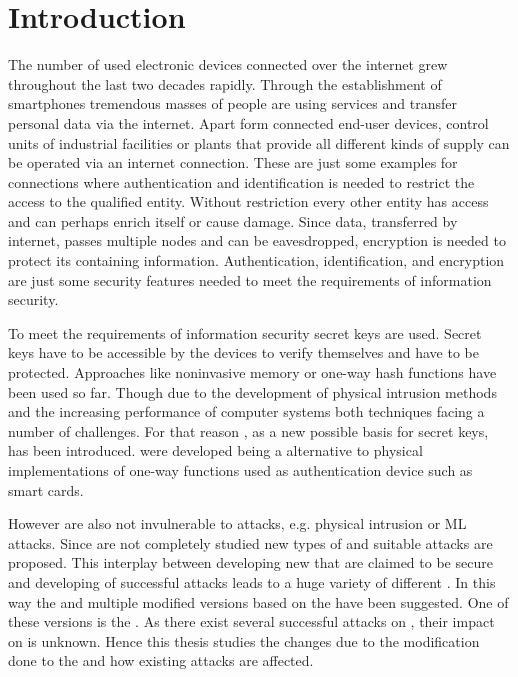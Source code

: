 \chapter{Introduction}

The number of used electronic devices connected over the internet grew throughout the last two decades rapidly.
Through the establishment of smartphones tremendous masses of people are using services and transfer personal data via the internet.
Apart form connected end-user devices, control units of industrial facilities or plants that provide all different kinds of supply can be operated via an internet connection.
These are just some examples for connections where authentication and identification is needed to restrict the access to the qualified entity.
Without restriction every other entity has access and can perhaps enrich itself or cause damage.
Since data, transferred by internet, passes multiple nodes and can be eavesdropped, encryption is needed to protect its containing information.
Authentication, identification, and encryption are just some security features needed to meet the requirements of information security.

To meet the requirements of information security secret keys are used.
Secret keys have to be accessible by the devices to verify themselves and have to be protected.
Approaches like noninvasive memory or one-way hash functions have been used so far.
Though due to the development of physical intrusion methods and the increasing performance of computer systems both techniques facing a number of challenges.
For that reason \pufs, as a new possible basis for secret keys, has been introduced.
\pufs were developed being a alternative to physical implementations of one-way functions used as authentication device such as smart cards. %


However \pufs are also not invulnerable to attacks, e.g. physical intrusion or \acl{ML} attacks.
Since \pufs are not completely studied new types of \pufs and suitable attacks are proposed.
This interplay between developing new \pufs that are claimed to be secure and developing of successful attacks leads to a huge variety of different \pufs.
In this way the \apuf and multiple modified versions based on the \apuf have been suggested.
One of these versions is the \mpuf.
As there exist several successful attacks on \apufs, their impact on \mpuf is unknown. %
Hence this thesis studies the changes due to the modification done to the \apuf and how existing attacks are affected.

